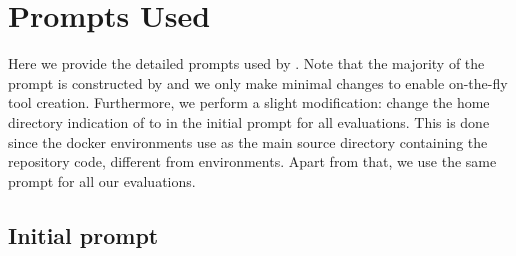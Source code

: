 \section{Prompts Used}
\label{appendix:initial_prompt}

Here we provide the detailed prompts used by \tech. 
Note that the majority of the prompt is constructed by \minisweagent and we only make minimal changes to enable on-the-fly tool creation.
Furthermore, we perform a slight modification: change the home directory indication of  to  in the initial prompt for all \swebenchpro evaluations.
This is done since the \swebenchpro docker environments use  as the main source directory containing the repository code, different from \swebench environments.
Apart from that, we use the same prompt for all our evaluations.

\subsection{Initial prompt}

